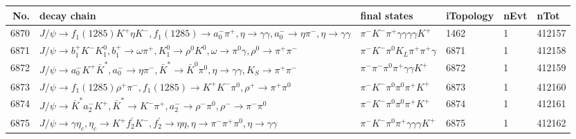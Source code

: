 \begin{table}[htbp] 
\begin{center}
\begin{small}
\begin{tabular}{rlllll}\hline\hline
 No. & decay chain & final states &  iTopology & nEvt & nTot \\\hline
6870&$J/\psi       \rightarrow f_{1}(1285)    K^{+}          \eta          K^{-}          , f_{1}(1285)     \rightarrow a_{0}^{-}      \pi^{+}        , \eta           \rightarrow \gamma       \gamma       , a_{0}^{-}       \rightarrow \eta          \pi^{-}        , \eta           \rightarrow \gamma       \gamma       $&$\pi^{-}        K^{-}          \pi^{+}        \gamma       \gamma       \gamma       \gamma       K^{+}          $& 1462&    1&412157\\
6871&$J/\psi       \rightarrow b_{1}^{+}      K^{-}          K_1^{0}        , b_{1}^{+}       \rightarrow \omega         \pi^{+}        , K_1^{0}         \rightarrow \rho^{0}      K^{0}          , \omega          \rightarrow \pi^{0}        \gamma       , \rho^{0}       \rightarrow \pi^{+}        \pi^{-}        $&$\pi^{-}        K^{-}          \pi^{0}        K_{L}          \pi^{+}        \pi^{+}        \gamma       $& 6871&    1&412158\\
6872&$J/\psi       \rightarrow a_{0}^{-}      K^{+}          \bar{K}^{*}   , a_{0}^{-}       \rightarrow \eta          \pi^{-}        , \bar{K}^{*}    \rightarrow \bar{K}^{0}   \pi^{0}        , \eta           \rightarrow \gamma       \gamma       , K_{S}           \rightarrow \pi^{+}        \pi^{-}        $&$\pi^{-}        \pi^{-}        \pi^{0}        \pi^{+}        \gamma       \gamma       K^{+}          $& 6872&    1&412159\\
6873&$J/\psi       \rightarrow f_{1}(1285)    \rho^{+}      \pi^{-}        , f_{1}(1285)     \rightarrow K^{+}          K^{-}          \pi^{0}        , \rho^{+}       \rightarrow \pi^{+}        \pi^{0}        $&$\pi^{-}        K^{-}          \pi^{0}        \pi^{0}        \pi^{+}        K^{+}          $& 6873&    1&412160\\
6874&$J/\psi       \rightarrow \bar{K}^{*}   a_{2}^{-}      K^{+}          , \bar{K}^{*}    \rightarrow K^{-}          \pi^{+}        , a_{2}^{-}       \rightarrow \rho^{-}      \pi^{0}        , \rho^{-}       \rightarrow \pi^{-}        \pi^{0}        $&$\pi^{-}        K^{-}          \pi^{0}        \pi^{0}        \pi^{+}        K^{+}          $& 6874&    1&412161\\
6875&$J/\psi       \rightarrow \gamma       \eta_{c}    , \eta_{c}     \rightarrow K^{+}          f_2^{'}       K^{-}          , f_2^{'}        \rightarrow \eta          \eta          , \eta           \rightarrow \pi^{-}        \pi^{+}        \pi^{0}        , \eta           \rightarrow \gamma       \gamma       $&$\pi^{-}        K^{-}          \pi^{0}        \pi^{+}        \gamma       \gamma       \gamma       K^{+}          $& 6875&    1&412162\\

\end{tabular}
\end{small}
\end{center}
\end{table}
